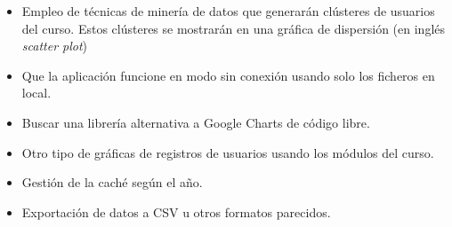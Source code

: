 \begin{itemize}
	\item Empleo de técnicas de minería de datos que generarán clústeres de usuarios del curso. Estos clústeres se mostrarán en una gráfica de dispersión (en inglés \textit{scatter plot})
	\item Que la aplicación funcione en modo sin conexión usando solo los ficheros en local. 
	\item Buscar una librería alternativa a Google Charts \cite{noauthor_charts_nodate} de código libre.
	\item Otro tipo de gráficas de registros de usuarios usando los módulos del curso.
	\item Gestión de la caché según el año.
	\item Exportación de datos a CSV u otros formatos parecidos.
\end{itemize}
